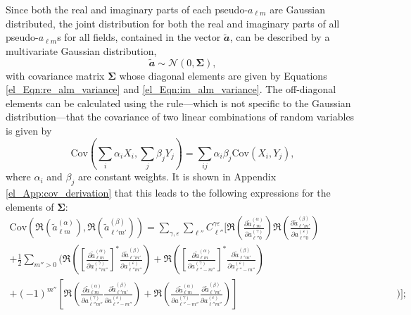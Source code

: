 Since both the real and imaginary parts of each pseudo-$a_{\ell m}$ are Gaussian distributed, the joint distribution for both the real and imaginary parts of all pseudo-$a_{\ell m}$s for all fields, contained in the vector $\widetilde{\mathbfit{a}}$, can be described by a multivariate Gaussian distribution,
\begin{equation}
    \widetilde{\mathbfit{a}} \sim
    \mathcal{N} \left( \mathbfit{0}, \bm{\Sigma} \right),
\end{equation}
with covariance matrix $\bm{\Sigma}$ whose diagonal elements are given by Equations \eqref{el_Eqn:re_alm_variance} and \eqref{el_Eqn:im_alm_variance}. The off-diagonal elements can be calculated using the rule---which is not specific to the Gaussian distribution---that the covariance of two linear combinations of random variables is given by
\begin{equation}
    \mathrm{Cov} \left( \sum_i \alpha_i X_i, \sum_j \beta_j Y_j \right) =
    \sum_{ij} \alpha_i \beta_j \mathrm{Cov} \left( X_i, Y_j \right),
    \label{el_Eqn:cov_addition}
\end{equation}
where $\alpha_i$ and $\beta_j$ are constant weights. It is shown in
Appendix \ref{el_App:cov_derivation}
that this leads to the following expressions for the elements of $\bm{\Sigma}$:
\begin{equation}
\begin{split}
\mathrm{Cov} \left(
\Re \left( \widetilde{a}_{\ell m}^{ \left( \alpha \right) } \right),
\Re \left( \widetilde{a}_{\ell' m'}^{ \left( \beta \right) } \right)
\right) =
\sum_{\gamma, \varepsilon}
\sum_{\ell''}
C_{\ell''}^{\gamma \varepsilon}
\Bigg[
\Re \left(
\frac{\partial \widetilde{a}_{\ell m}^{ \left( \alpha \right) }}
{\partial a_{\ell'' 0}^{ \left( \gamma \right) }}
\right)
\Re \left(
\frac{\partial \widetilde{a}_{\ell' m'}^{ \left( \beta \right) }}
{\partial a_{\ell'' 0}^{ \left( \varepsilon \right) }}
\right)
\qquad\qquad\qquad\quad & \\
+
\frac{1}{2}
\sum_{m'' > 0} \Bigg(
\Re \left(
\left[
\frac{\partial \widetilde{a}_{\ell m}^{ \left( \alpha \right) }}
{\partial a_{\ell'' m''}^{ \left( \gamma \right) }}
\right]^*
\frac{\partial \widetilde{a}_{\ell' m'}^{ \left( \beta \right) }}
{\partial a_{\ell'' m''}^{ \left( \varepsilon \right) }}
\right)
+ \Re \left(
\left[
\frac{\partial \widetilde{a}_{\ell m}^{ \left( \alpha \right) }}
{\partial a_{\ell'' -m''}^{ \left( \gamma \right) }}
\right]^*
\frac{\partial \widetilde{a}_{\ell' m'}^{ \left( \beta \right) }}
{\partial a_{\ell'' -m''}^{ \left( \varepsilon \right) }}
\right) & \\
+
\left( -1 \right)^{m''} \left[
\Re \left(
\frac{\partial \widetilde{a}_{\ell m}^{ \left( \alpha \right) }}
{\partial a_{\ell'' m''}^{ \left( \gamma \right) }}
\frac{\partial \widetilde{a}_{\ell' m'}^{ \left( \beta \right) }}
{\partial a_{\ell'' -m''}^{ \left( \varepsilon \right) }}
\right)
+ \Re \left(
\frac{\partial \widetilde{a}_{\ell m}^{ \left( \alpha \right) }}
{\partial a_{\ell'' -m''}^{ \left( \gamma \right) }}
\frac{\partial \widetilde{a}_{\ell' m'}^{ \left( \beta \right) }}
{\partial a_{\ell'' m''}^{ \left( \varepsilon \right) }}
\right) \right] &
\Bigg) \Bigg];
\label{el_Eqn:cov_re_re_general}
\end{split}
\end{equation}
